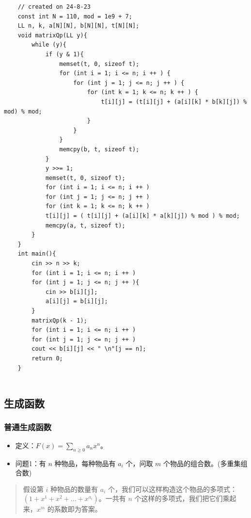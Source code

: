 \documentclass[a4paper,12pt]{article}
\begin{document}
\begin{lstlisting}
    // created on 24-8-23
    const int N = 110, mod = 1e9 + 7;
    LL n, k, a[N][N], b[N][N], t[N][N];
    void matrixQp(LL y){
        while (y){
            if (y & 1){
                memset(t, 0, sizeof t);
                for (int i = 1; i <= n; i ++ ) {
                    for (int j = 1; j <= n; j ++ ) {
                        for (int k = 1; k <= n; k ++ ) {
                            t[i][j] = (t[i][j] + (a[i][k] * b[k][j]) % mod) % mod;
                        }
                    }
                }
                memcpy(b, t, sizeof t);
            }
            y >>= 1;
            memset(t, 0, sizeof t);
            for (int i = 1; i <= n; i ++ )
            for (int j = 1; j <= n; j ++ )	
            for (int k = 1; k <= n; k ++ )
            t[i][j] = ( t[i][j] + (a[i][k] * a[k][j]) % mod ) % mod;
            memcpy(a, t, sizeof t);
        }
    }
    int main(){
        cin >> n >> k;
        for (int i = 1; i <= n; i ++ )
        for (int j = 1; j <= n; j ++ ){
            cin >> b[i][j];
            a[i][j] = b[i][j];
        }
        matrixQp(k - 1);
        for (int i = 1; i <= n; i ++ )
        for (int j = 1; j <= n; j ++ )
        cout << b[i][j] << " \n"[j == n];
        return 0;
    }
    
\end{lstlisting}

\subsection{生成函数}

\subsubsection{普通生成函数}

\begin{itemize}
\item
    定义：\(F(x) = \sum_{n\geq0} a_n x^n\)。
\item
    问题1：有 \(n\) 种物品，每种物品有 \(a_i\) 个，问取 \(m\)
    个物品的组合数。(多重集组合数)
\end{itemize}

\begin{quote}
假设第 \(i\) 种物品的数量有 \(a_i\)
个，我们可以这样构造这个物品的多项式：\((1+x^1+x^2+...+x^{a_i})\)。一共有
\(n\) 个这样的多项式，我们把它们乘起来，\(x^m\) 的系数即为答案。
\end{quote}
\end{document}
